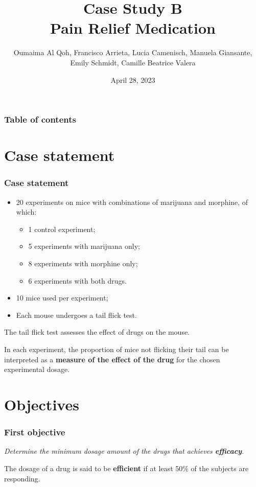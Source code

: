 \documentclass[14pt]{beamer}
\author{Oumaima Al Qoh, Francisco Arrieta, Lucia Camenisch, Manuela Giansante, Emily Schmidt, Camille Beatrice Valera}
\title{Case Study B \\ Pain Relief Medication}
\date{April 28, 2023}
\begin{document}
\begin{frame}
\titlepage
\end{frame}



\begin{frame}
\frametitle{Table of contents}
\tableofcontents
\end{frame}


\section{Case statement}
\begin{frame}
\frametitle{Case statement}
\begin{itemize}[label={$\blacktriangleright$}]
\item 20 experiments on mice with combinations of marijuana and morphine, of which:
\begin{itemize}[label={$\blacktriangleright$}]
\item 1 control experiment;
\item 5 experiments with marijuana only;
\item 8 experiments with morphine only;
\item 6 experiments with both drugs.
\end{itemize}
\item 10 mice used per experiment;
\item Each mouse undergoes a tail flick test.
\end{itemize}
\end{frame}

\begin{frame}
The tail flick test assesses the effect of drugs on the mouse.

\bigskip

In each experiment, the proportion of mice not flicking their tail can be interpreted as a \textbf{measure of the effect of the drug} for the chosen experimental dosage.
\end{frame}

\section{Objectives}
\begin{frame}
\frametitle{First objective}
\textit{Determine the minimum dosage amount of the drugs that achieves \textbf{efficacy}.}

\bigskip

The dosage of a drug is said to be \textbf{efficient} if at least 50\% of the subjects are responding.
\end{frame}
\end{document}
